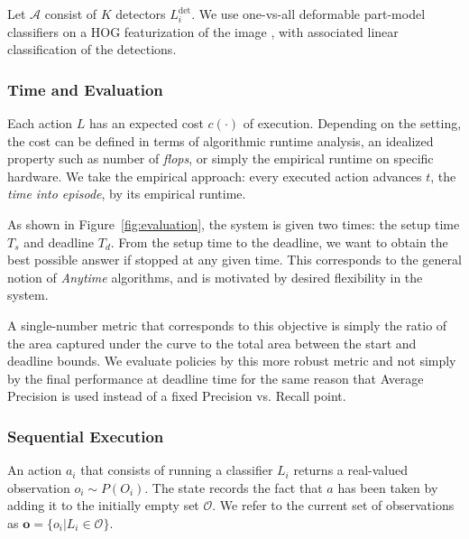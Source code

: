 Let $\mathcal{A}$ consist of $K$ detectors $L^\text{det}_i$.
We use one-vs-all deformable part-model classifiers on a HOG featurization of the image \cite{Felzenszwalb2010a}, with associated linear classification of the detections.


\subsubsection{Time and Evaluation}
Each action $L$ has an expected cost $c(\cdot)$ of execution.
Depending on the setting, the cost can be defined in terms of algorithmic runtime analysis, an idealized property such as number of \emph{flops}, or simply the empirical runtime on specific hardware.
We take the empirical approach: every executed action advances $t$, the \emph{time into episode}, by its empirical runtime.

As shown in Figure~\ref{fig:evaluation}, the system is given two times: the setup time $T_s$ and deadline $T_d$.
From the setup time to the deadline, we want to obtain the best possible answer if stopped at any given time.
This corresponds to the general notion of \emph{Anytime} algorithms, and is motivated by desired flexibility in the system.

A single-number metric that corresponds to this objective is simply the ratio of the area captured under the curve to the total area between the start and deadline bounds.
We evaluate policies by this more robust metric and not simply by the final performance at deadline time for the same reason that Average Precision is used instead of a fixed Precision vs. Recall point.

\subsubsection{Sequential Execution}
An action $a_i$ that consists of running a classifier $L_i$ returns a real-valued observation $o_i \sim P(O_i)$.
The state records the fact that $a$ has been taken by adding it to the initially empty set $\mathcal{O}$.
We refer to the current set of observations as $\mathbf{o} = \{o_i | L_i \in \mathcal{O}\}$.

